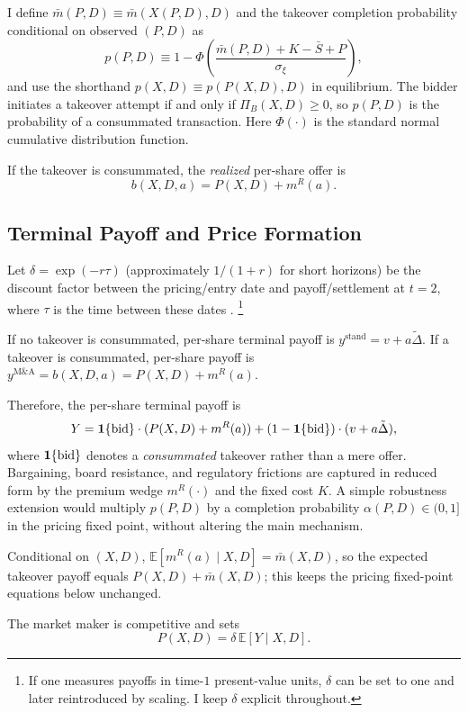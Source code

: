 \documentclass[11pt]{article}
\newcommand{\E}{\mathbb{E}}
\newcommand{\1}{\mathbf{1}}
\begin{document}
I define $\bar{m}(P,D)\equiv \bar{m}(X(P,D),D)$ and the takeover completion probability conditional on observed $(P,D)$ as
\begin{equation}
p(P,D) \equiv 1 - \Phi\left(\frac{\bar{m}(P,D) + K - \bar{S} + P}{\sigma_\xi}\right),
\label{eq:bid-prob}
\end{equation}
and use the shorthand $p(X,D)\equiv p(P(X,D),D)$ in equilibrium. The bidder initiates a takeover attempt if and only if $\Pi_B(X,D) \geq 0$, so $p(P,D)$ is the probability of a consummated transaction.
Here $\Phi(\cdot)$ is the standard normal cumulative distribution function.

If the takeover is consummated, the \emph{realized} per-share offer is
\[
b(X,D,a) = P(X,D) + m^{R}(a).
\]

%
\subsection{Terminal Payoff and Price Formation}
%

Let $\delta = \exp(-r\tau)$ (approximately $1/(1+r)$ for short horizons) be the discount factor between the pricing/entry date and payoff/settlement at $t=2$, where $\tau$ is the time between these dates \citep{Cochrane2005,Duffie2010}.%
\footnote{If one measures payoffs in time-$1$ present-value units, $\delta$ can be set to one and later reintroduced by scaling. I keep $\delta$ explicit throughout.}

If no takeover is consummated, per-share terminal payoff is $y^{\text{stand}} = v + a\tilde{\Delta}$. If a takeover is consummated, per-share payoff is $y^{\text{M\&A}} = b(X,D,a) = P(X,D) + m^{R}(a)$.

Therefore, the per-share terminal payoff is
\[
Y = \1\{\textup{bid}\} \cdot (P(X,D) + m^{R}(a)) + (1 - \1\{\textup{bid}\}) \cdot (v + a\tilde{\Delta}),
\]
where $\1\{\textup{bid}\}$ denotes a \emph{consummated} takeover rather than a mere offer. Bargaining, board resistance, and regulatory frictions are captured in reduced form by the premium wedge $m^{R}(\cdot)$ and the fixed cost $K$. A simple robustness extension would multiply $p(P,D)$ by a completion probability $\alpha(P,D)\in(0,1]$ in the pricing fixed point, without altering the main mechanism.

Conditional on $(X,D)$, $\E[m^{R}(a) \mid X,D]=\bar{m}(X,D)$, so the expected takeover payoff equals $P(X,D)+\bar{m}(X,D)$; this keeps the pricing fixed-point equations below unchanged.

The market maker is competitive and sets
\begin{equation}
P(X,D) = \delta \, \E[Y \mid X, D].
\label{eq:pricing}
\end{equation}
\end{document}
